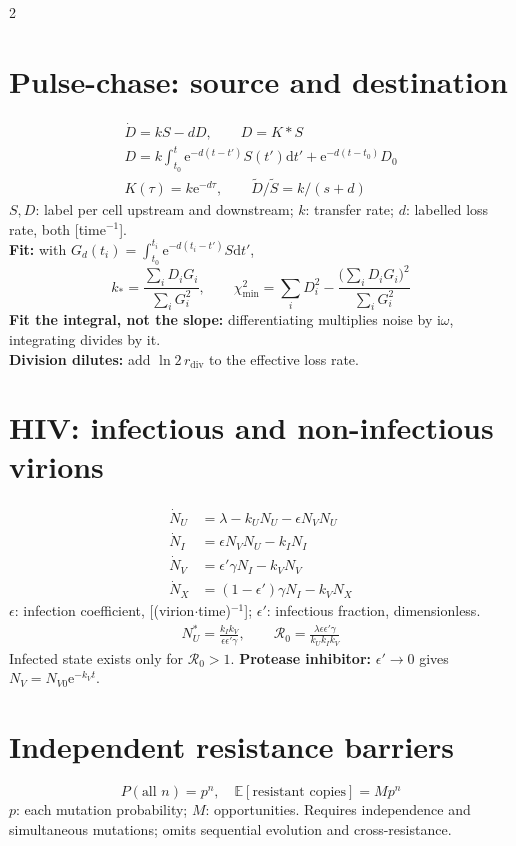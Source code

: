 \documentclass[10pt,a4paper]{scrartcl}
\newcommand{\dd}{\mathrm{d}}
\newcommand{\ee}{\mathrm{e}}
\begin{document}
\begin{multicols}{2}
\section*{Pulse-chase: source and destination}
\begin{gather*}
\dot D=kS-dD,\qquad D=K*S\\
D=k\!\int_{t_0}^{t}\!\ee^{-d(t-t')}S(t')\dd t'
  +\ee^{-d(t-t_0)}D_0\\
K(\tau)=k\ee^{-d\tau},\qquad \tilde D/\tilde S=k/(s+d)
\end{gather*}
$S,D$: label per cell upstream and downstream; $k$: transfer rate; $d$: labelled loss rate, both [time$^{-1}$].\\
\textbf{Fit:} with $G_d(t_i)=\int_{t_0}^{t_i}\ee^{-d(t_i-t')}S\dd t'$,
\begin{equation*}
k_*=\frac{\sum_iD_iG_i}{\sum_iG_i^2},\qquad
\chi^2_{\min}=\sum_iD_i^2-\frac{\bigl(\sum_iD_iG_i\bigr)^2}{\sum_iG_i^2}
\end{equation*}
\textbf{Fit the integral, not the slope:} differentiating multiplies noise by $\mathrm{i}\omega$, integrating divides by it.\\
\textbf{Division dilutes:} add $\ln2\,r_{\mathrm{div}}$ to the effective loss rate.

\section*{HIV: infectious and non-infectious virions}
\begin{align*}
\dot N_U&=\lambda-k_UN_U-\epsilon N_VN_U\\
\dot N_I&=\epsilon N_VN_U-k_IN_I\\
\dot N_V&=\epsilon'\gamma N_I-k_VN_V\\
\dot N_X&=(1-\epsilon')\gamma N_I-k_VN_X
\end{align*}
$\epsilon$: infection coefficient, [(virion$\cdot$time)$^{-1}$]; $\epsilon'$: infectious fraction, dimensionless.
\begin{gather*}
N_U^*=\frac{k_Ik_V}{\epsilon\epsilon'\gamma},\qquad
\mathcal R_0=\frac{\lambda\epsilon\epsilon'\gamma}{k_Uk_Ik_V}
\end{gather*}
Infected state exists only for $\mathcal R_0>1$. \textbf{Protease inhibitor:} $\epsilon'\to0$ gives $N_V=N_{V0}\ee^{-k_Vt}$.
\section*{Independent resistance barriers}
\begin{equation*}
P(\text{all }n)=p^n,\quad
\mathbb E[\text{resistant copies}]=Mp^n
\end{equation*}
$p$: each mutation probability; $M$: opportunities. Requires independence and simultaneous mutations; omits sequential evolution and cross-resistance.


\end{multicols}
\end{document}
